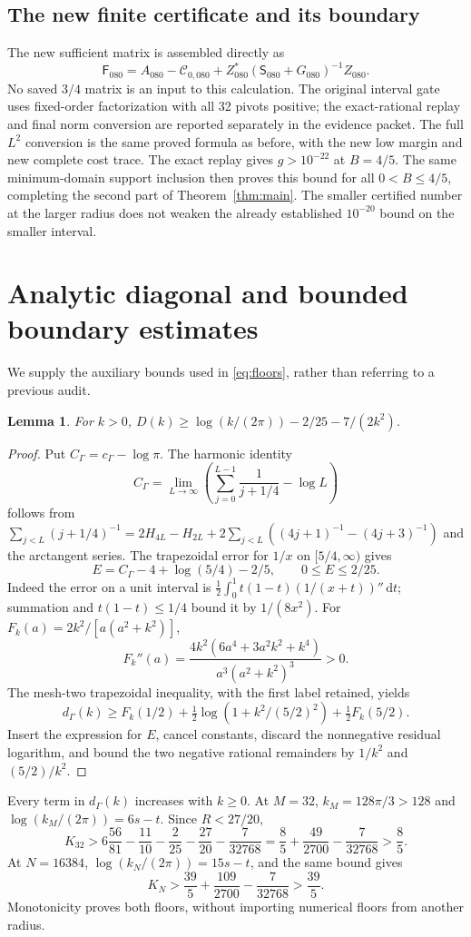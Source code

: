 \documentclass[11pt]{article}
\newtheorem{lemma}{Lemma}
\newcommand{\dd}{\,\mathrm d}
\begin{document}
\subsection{The new finite certificate and its boundary}

The new sufficient matrix is assembled directly as
\[
 \mathsf F_{080}=A_{080}-\mathcal C_{0,080}
       +Z_{080}^*(\mathsf S_{080}+G_{080})^{-1}Z_{080}.
\]
No saved $3/4$ matrix is an input to this calculation. The original interval gate uses fixed-order factorization with all 32 pivots positive; the exact-rational replay and final norm conversion are reported separately in the evidence packet. The full $L^2$ conversion is the same proved formula as before, with the new low margin and new complete cost trace. The exact replay gives $g>10^{-22}$ at $B=4/5$. The same minimum-domain support inclusion then proves this bound for all $0<B\le4/5$, completing the second part of Theorem~\ref{thm:main}. The smaller certified number at the larger radius does not weaken the already established $10^{-20}$ bound on the smaller interval.

\appendix
\section{Analytic diagonal and bounded boundary estimates}\label{app:bounds}
We supply the auxiliary bounds used in \eqref{eq:floors}, rather than referring to a previous audit.

\begin{lemma}
For $k>0$, $D(k)\ge\log(k/(2\pi))-2/25-7/(2k^2)$.
\end{lemma}
\begin{proof}
Put $C_\Gamma=c_\Gamma-\log\pi$. The harmonic identity
\[
 C_\Gamma=\lim_{L\to\infty}\left(\sum_{j=0}^{L-1}\frac1{j+1/4}-\log L\right)
\]
follows from $\sum_{j<L}(j+1/4)^{-1}=2H_{4L}-H_{2L}+2\sum_{j<L}((4j+1)^{-1}-(4j+3)^{-1})$ and the arctangent series. The trapezoidal error for $1/x$ on $[5/4,\infty)$ gives
\[
 E=C_\Gamma-4+\log(5/4)-2/5,\qquad 0\le E\le2/25.
\]
Indeed the error on a unit interval is $\tfrac12\int_0^1t(1-t)(1/(x+t))''\dd t$; summation and $t(1-t)\le1/4$ bound it by $1/(8x^2)$. For $F_k(a)=2k^2/[a(a^2+k^2)]$,
\[
 F_k''(a)=\frac{4k^2(6a^4+3a^2k^2+k^4)}{a^3(a^2+k^2)^3}>0.
\]
The mesh-two trapezoidal inequality, with the first label retained, yields
\[
 d_\Gamma(k)\ge F_k(1/2)+\tfrac12\log(1+k^2/(5/2)^2)+\tfrac12F_k(5/2).
\]
Insert the expression for $E$, cancel constants, discard the nonnegative residual logarithm, and bound the two negative rational remainders by $1/k^2$ and $(5/2)/k^2$.
\end{proof}
Every term in $d_\Gamma(k)$ increases with $k\ge0$. At $M=32$, $k_M=128\pi/3>128$ and $\log(k_M/(2\pi))=6s-t$. Since $R<27/20$,
\[
 K_{32}>6\frac{56}{81}-\frac{11}{10}-\frac2{25}-\frac{27}{20}
 -\frac7{32768}=\frac85+\frac{49}{2700}-\frac7{32768}>\frac85.
\]
At $N=16384$, $\log(k_N/(2\pi))=15s-t$, and the same bound gives
\[
 K_N>\frac{39}5+\frac{109}{2700}-\frac7{32768}>\frac{39}5.
\]
Monotonicity proves both floors, without importing numerical floors from another radius.
\end{document}
